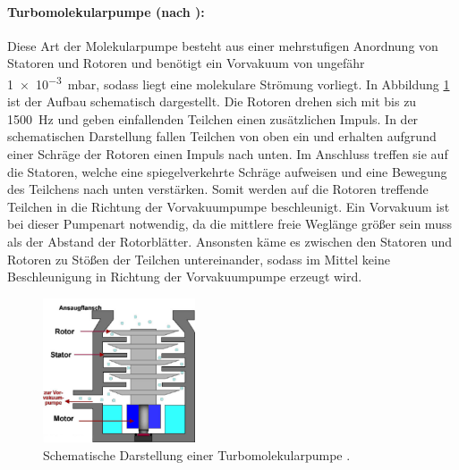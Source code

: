 \paragraph{Turbomolekularpumpe (nach \cite{pfeiffer}):}
Diese Art der Molekularpumpe besteht aus einer mehrstufigen Anordnung von Statoren und Rotoren
und benötigt ein Vorvakuum von ungefähr
\SI[retain-unity-mantissa=false]{1e-3}{\milli\bar},
sodass liegt eine molekulare Strömung vorliegt.
In Abbildung \ref{fig:TMP} ist der Aufbau schematisch dargestellt.
Die Rotoren drehen sich mit bis zu \SI{1500}{\hertz} und geben einfallenden
Teilchen einen zusätzlichen Impuls.
In der schematischen Darstellung fallen Teilchen von oben ein und erhalten
aufgrund einer Schräge der Rotoren einen Impuls nach unten.
Im Anschluss treffen sie auf die Statoren,
welche eine spiegelverkehrte Schräge aufweisen und eine Bewegung des Teilchens
nach unten verstärken.
Somit werden auf die Rotoren treffende Teilchen
in die Richtung der Vorvakuumpumpe beschleunigt.
Ein Vorvakuum ist bei dieser Pumpenart notwendig,
da die mittlere freie Weglänge größer sein muss als der Abstand der Rotorblätter.
Ansonsten käme es zwischen den Statoren und Rotoren zu Stößen der Teilchen untereinander,
sodass im Mittel keine Beschleunigung in Richtung der Vorvakuumpumpe erzeugt wird.
\begin{figure}
  \centering
  \includegraphics[width=0.4\textwidth]{TMP.JPG}
  \caption{Schematische Darstellung einer Turbomolekularpumpe \cite{TMP}.}
  \label{fig:TMP}
\end{figure}
\FloatBarrier

